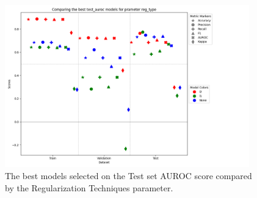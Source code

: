 \begin{figure}[H]
    \centering
    \includegraphics[width=400px]{Figures/results/reg_type/reg_type_test_auroc.png}
    \caption{The best models selected on the Test set AUROC score compared by the Regularization Techniques parameter.}
    \label{fig: reg_type_test_auroc}
\end{figure}


